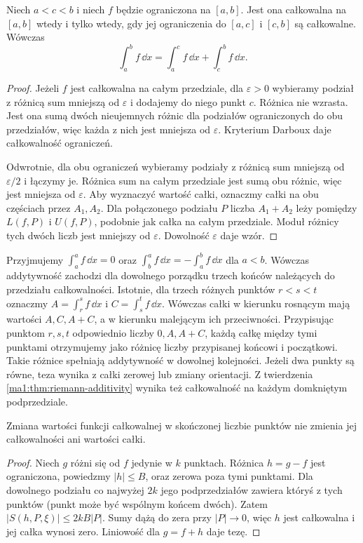 \begin{twierdzenie}
\label{ma1:thm:riemann-additivity}
Niech $a<c<b$ i niech $f$ będzie ograniczona na $[a,b]$. Jest ona całkowalna na $[a,b]$ wtedy i tylko wtedy, gdy jej ograniczenia do $[a,c]$ i $[c,b]$ są całkowalne. Wówczas
\[
 \int_a^b f\,\dd x=\int_a^c f\,\dd x+\int_c^b f\,\dd x.
\]
\end{twierdzenie}
\begin{proof}
Jeżeli $f$ jest całkowalna na całym przedziale, dla $\varepsilon>0$ wybieramy podział z różnicą sum mniejszą od $\varepsilon$ i dodajemy do niego punkt $c$. Różnica nie wzrasta. Jest ona sumą dwóch nieujemnych różnic dla podziałów ograniczonych do obu przedziałów, więc każda z nich jest mniejsza od $\varepsilon$. Kryterium Darboux daje całkowalność ograniczeń.

Odwrotnie, dla obu ograniczeń wybieramy podziały z różnicą sum mniejszą od $\varepsilon/2$ i łączymy je. Różnica sum na całym przedziale jest sumą obu różnic, więc jest mniejsza od $\varepsilon$. Aby wyznaczyć wartość całki, oznaczmy całki na obu częściach przez $A_1,A_2$. Dla połączonego podziału $P$ liczba $A_1+A_2$ leży pomiędzy $L(f,P)$ i $U(f,P)$, podobnie jak całka na całym przedziale. Moduł różnicy tych dwóch liczb jest mniejszy od $\varepsilon$. Dowolność $\varepsilon$ daje wzór.
\end{proof}
Przyjmujemy $\int_a^a f\,\dd x=0$ oraz $\int_b^a f\,\dd x=-\int_a^b f\,\dd x$ dla $a<b$. Wówczas addytywność zachodzi dla dowolnego porządku trzech końców należących do przedziału całkowalności. Istotnie, dla trzech różnych punktów $r<s<t$ oznaczmy $A=\int_r^s f\,\dd x$ i $C=\int_s^t f\,\dd x$. Wówczas całki w kierunku rosnącym mają wartości $A,C,A+C$, a w kierunku malejącym ich przeciwności. Przypisując punktom $r,s,t$ odpowiednio liczby $0,A,A+C$, każdą całkę między tymi punktami otrzymujemy jako różnicę liczby przypisanej końcowi i początkowi. Takie różnice spełniają addytywność w dowolnej kolejności. Jeżeli dwa punkty są równe, teza wynika z całki zerowej lub zmiany orientacji. Z twierdzenia \ref{ma1:thm:riemann-additivity} wynika też całkowalność na każdym domkniętym podprzedziale.

\begin{wniosek}
\label{ma1:cor:riemann-finite-changes}
Zmiana wartości funkcji całkowalnej w skończonej liczbie punktów nie zmienia jej całkowalności ani wartości całki.
\end{wniosek}
\begin{proof}
Niech $g$ różni się od $f$ jedynie w $k$ punktach. Różnica $h=g-f$ jest ograniczona, powiedzmy $|h|\le B$, oraz zerowa poza tymi punktami. Dla dowolnego podziału co najwyżej $2k$ jego podprzedziałów zawiera któryś z tych punktów (punkt może być wspólnym końcem dwóch). Zatem $|S(h,P,\xi)|\le 2kB|P|$. Sumy dążą do zera przy $|P|\to0$, więc $h$ jest całkowalna i jej całka wynosi zero. Liniowość dla $g=f+h$ daje tezę.
\end{proof}

